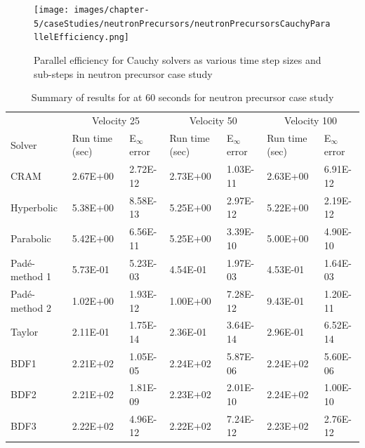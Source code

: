 \clearpage

\begin{landscape}
\thispagestyle{mylandscape}
\begin{figure}[p]
    \centering
    \texttt{[image: images/chapter-5/caseStudies/neutronPrecursors/neutronPrecursorsCauchyParallelEfficiency.png]}
    \caption{Parallel efficiency for Cauchy solvers as various time step sizes and sub-steps in neutron precursor case study}
    \label{fig:neutron_precursors_cauchy_parallel_eff}
\end{figure}
\end{landscape}

\clearpage

\begin{table}[p]
\centering
\begin{adjustbox}{width=1\textwidth}
\begin{threeparttable}
   \caption{\label{tab:neutron_precursors_runtimes} Summary of results for at 60 seconds for neutron precursor case study}
   \begin{tabular}{lllllll}
   \hline
   \multicolumn{1}{c}{} & \multicolumn{2}{c}{Velocity 25\tnote{1}} & \multicolumn{2}{c}{Velocity 50\tnote{1}} & \multicolumn{2}{c}{Velocity 100\tnote{1}}\\
   \cline{2-7} 
   Solver & Run time (sec) & E$_{\infty}$ error & Run time (sec) & E$_{\infty}$ error & Run time (sec) & E$_{\infty}$ error\\
   \hline
	CRAM\tnote{2} & 2.67E+00 & 2.72E-12 & 2.73E+00 & 1.03E-11 & 2.63E+00 & 6.91E-12 \\
	Hyperbolic\tnote{2} & 5.38E+00 & 8.58E-13 & 5.25E+00 & 2.97E-12 & 5.22E+00 & 2.19E-12 \\
	Parabolic\tnote{2} & 5.42E+00 & 6.56E-11 & 5.25E+00 & 3.39E-10 & 5.00E+00 & 4.90E-10 \\
	Pad\'e-method 1 & 5.73E-01 & 5.23E-03 & 4.54E-01 & 1.97E-03 & 4.53E-01 & 1.64E-03 \\
	Pad\'e-method 2 & 1.02E+00 & 1.93E-12 & 1.00E+00 & 7.28E-12 & 9.43E-01 & 1.20E-11 \\
	Taylor & 2.11E-01 & 1.75E-14 & 2.36E-01 & 3.64E-14 & 2.96E-01 & 6.52E-14 \\
	BDF1\tnote{3} & 2.21E+02 & 1.05E-05 & 2.24E+02 & 5.87E-06 & 2.24E+02 & 5.60E-06 \\
	BDF2\tnote{3} & 2.21E+02 & 1.81E-09 & 2.23E+02 & 2.01E-10 & 2.24E+02 & 1.00E-10 \\
	BDF3\tnote{3} & 2.22E+02 & 4.96E-12 & 2.22E+02 & 7.24E-12 & 2.23E+02 & 2.76E-12 \\

\end{tabular}
\end{threeparttable}
\end{adjustbox}
\end{table}
